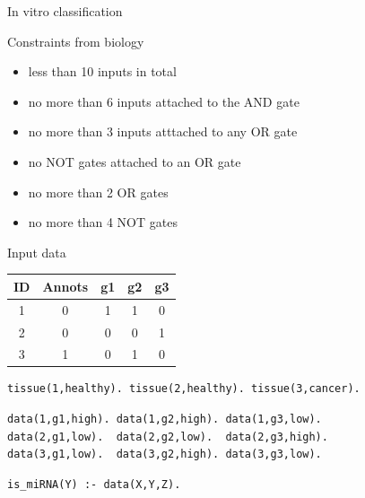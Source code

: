 \documentclass[10pt,dvipsnames]{beamer}
\begin{document}
\begin{frame}{In vitro classification}
\end{frame}


\begin{frame}{Constraints from biology}
\begin{itemize}
\item less than 10 inputs in total
\item no more than 6 inputs attached to the AND gate
\item no more than 3 inputs atttached to any OR gate
\item no NOT gates attached to an OR gate
\item no more than 2 OR gates
\item no more than 4 NOT gates
\end{itemize}
\end{frame}


\begin{frame}[fragile]{Input data}
\begin{center}
\begin{tabular}{|c|c|c|c|c|}
\hline
ID&	Annots&	g1&	g2&	g3\\
\hline
1&	0&	1&	1&	0\\
2&	0&	0&	0&	1\\
3&	1&	0&	1&	0\\
\hline
\end{tabular}
\end{center}
\vspace{0.2cm}
\begin{verbatim}
tissue(1,healthy). tissue(2,healthy). tissue(3,cancer).
\end{verbatim}

\begin{verbatim}
data(1,g1,high). data(1,g2,high). data(1,g3,low).
data(2,g1,low).  data(2,g2,low).  data(2,g3,high).
data(3,g1,low).  data(3,g2,high). data(3,g3,low).
\end{verbatim}

\begin{verbatim}
is_miRNA(Y) :- data(X,Y,Z).
\end{verbatim}
\end{frame}
\end{document}
